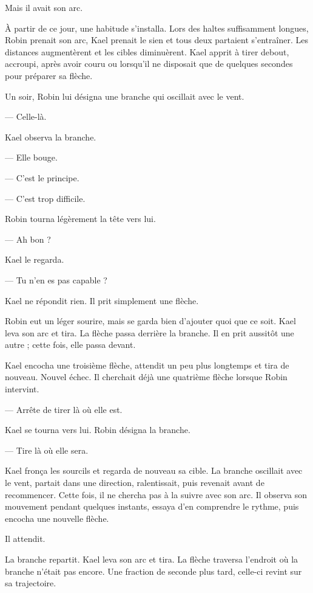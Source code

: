 Mais il avait son arc.

\scenebreak

À partir de ce jour, une habitude s'installa. Lors des haltes suffisamment
longues, Robin prenait son arc, Kael prenait le sien et tous deux partaient
s'entraîner. Les distances augmentèrent et les cibles diminuèrent. Kael apprit
à tirer debout, accroupi, après avoir couru ou lorsqu'il ne disposait que de
quelques secondes pour préparer sa flèche.

Un soir, Robin lui désigna une branche qui oscillait avec le vent.

— Celle-là.

Kael observa la branche.

— Elle bouge.

— C'est le principe.

— C'est trop difficile.

Robin tourna légèrement la tête vers lui.

— Ah bon ?

Kael le regarda.

— Tu n'en es pas capable ?

Kael ne répondit rien. Il prit simplement une flèche.

Robin eut un léger sourire, mais se garda bien d'ajouter quoi que ce soit.
Kael leva son arc et tira. La flèche passa derrière la branche. Il en prit
aussitôt une autre ; cette fois, elle passa devant.

Kael encocha une troisième flèche, attendit un peu plus longtemps et tira de
nouveau. Nouvel échec. Il cherchait déjà une quatrième flèche lorsque Robin
intervint.

— Arrête de tirer là où elle est.

Kael se tourna vers lui. Robin désigna la branche.

— Tire là où elle sera.

Kael fronça les sourcils et regarda de nouveau sa cible. La branche oscillait
avec le vent, partait dans une direction, ralentissait, puis revenait avant de
recommencer. Cette fois, il ne chercha pas à la suivre avec son arc. Il observa
son mouvement pendant quelques instants, essaya d'en comprendre le rythme, puis
encocha une nouvelle flèche.

Il attendit.

La branche repartit. Kael leva son arc et tira. La flèche traversa l'endroit où
la branche n'était pas encore. Une fraction de seconde plus tard, celle-ci
revint sur sa trajectoire.

